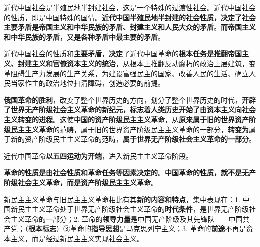 {近代中国社会是半殖民地半封建社会}，这是一个特殊的过渡性社会。近代中国社会的性质，即是中国特殊的国情。\textbf{{近代中国半殖民地半封建的社会性质，决定了社会主要矛盾是帝国主义和中华民族的矛盾、封建主义和人民大众的矛盾}}。\textbf{{而帝国主义和中华民族的矛盾，又是各种矛盾中最主要的矛盾}}。

近代中国社会的性质和\textbf{{主要矛盾}}，\textbf{{决定}}了近代中国革命的\textbf{{根本任务是推翻帝国主义、封建主义和官僚资本主义的统治}}，从根本上推翻反动腐朽的政治上层建筑，变革阻碍生产力发展的生产关系，为建设富强民主的国家、改善人民的生活、确立人民当家作主的政治地位扫清障碍，创造必要的前提。

\textbf{{俄国革命的胜利}}，改变了整个世界历史的方向，划分了整个世界历史的时代，\textbf{{开辟了世界无产阶级社会主义革命的新纪元，标志着人类历史开始了由资本主义向社会主义转变的进程}}。这使\textbf{{中国的资产阶级民主主义革命}}，从\textbf{{原来属于旧的世界资产阶级民主主义革命}}的范畴，属于旧的世界资产阶级民主主义革命的一部分，\textbf{{转变为}}属于新的资产阶级民主主义革命的范畴，\textbf{{属于世界无产阶级社会主义革命的一部分}}。

近代中国革命\textbf{{以五四运动为开端}}，进入新民主主义革命阶段。

\textbf{{革命的性质是由社会性质和革命任务等因素决定的}}。\textbf{{中国革命的性质，就不是无产阶级社会主义革命，而是资产阶级民主主义革命}}。

{新民主主义革命与旧民主主义革命相比有其}\textbf{{新的内容和特点}}{，集中表现在：1.
中国新民主主义革命处于世界无产阶级社会主义革命的}\textbf{{时代条件}}{，是世界无产阶级社会主义革命的一部分；2.
革命的}\textbf{{领导力量}}{是中国无产阶级及其先锋队------中国共产党；（}\textbf{{根本标志}}{）③革命的}\textbf{{指导思想}}{是马克思列宁主义；3.
革命的}\textbf{{前途}}{不再是资本主义，而是经过新民主主义实现社会主义。}
